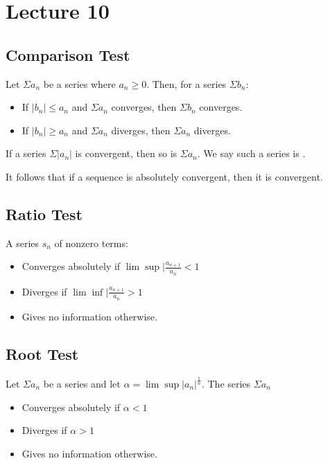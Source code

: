 \documentclass{book}
\begin{document}
\section{Lecture 10}
\subsection{Comparison Test}
Let $\Sigma a_n$ be a series where $a_n \geq 0$. Then, for a series $\Sigma b_n$:
\begin{itemize}
    \item If $|b_n| \leq a_n$ and $\Sigma a_n$ converges, then $\Sigma b_n$ converges.
    \item If $|b_n| \geq a_n$ and $\Sigma a_n$ diverges, then $\Sigma a_n$ diverges.
\end{itemize}

\begin{defn}
    If a series $\Sigma |a_n|$ is convergent, then so is $\Sigma a_n$. We say such a series is .
\end{defn}

It follows that if a sequence is absolutely convergent, then it is convergent.

\subsection{Ratio Test}
A series $s_n$ of nonzero terms:
\begin{itemize}
    \item Converges absolutely if $\lim \sup |\frac{a_{n+1}}{a_n} < 1$
    \item Diverges if $\lim \inf |\frac{a_{n+1}}{a_n} > 1$ 
    \item Gives no information otherwise.
\end{itemize}

\subsection{Root Test}
Let $\Sigma a_n$ be a series and let $\alpha = \lim \sup |a_n|^\frac{1}{n}$. The series $\Sigma a_n$
\begin{itemize}
    \item Converges absolutely if $\alpha < 1$
    \item Diverges if $\alpha > 1$
    \item Gives no information otherwise.
\end{itemize}
\end{document}
